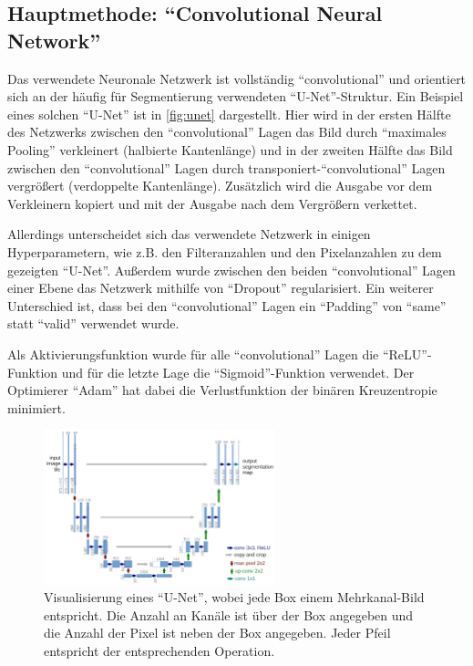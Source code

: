 \subsection{Hauptmethode: \enquote{Convolutional Neural Network}}
\label{ssec:Hauptmethode}

Das verwendete Neuronale Netzwerk ist vollständig \enquote{convolutional} und orientiert sich an der häufig für Segmentierung verwendeten \enquote{U-Net}-Struktur.\cite{ronneberger2015unet}
Ein Beispiel eines solchen \enquote{U-Net} ist in \autoref{fig:unet} dargestellt.
Hier wird in der ersten Hälfte des Netzwerks zwischen den \enquote{convolutional} Lagen das Bild durch \enquote{maximales Pooling} verkleinert (halbierte Kantenlänge) 
und in der zweiten Hälfte das Bild zwischen den \enquote{convolutional} Lagen durch transponiert-\enquote{convolutional} Lagen vergrößert (verdoppelte Kantenlänge).
Zusätzlich wird die Ausgabe vor dem Verkleinern kopiert und mit der Ausgabe nach dem Vergrößern verkettet.

Allerdings unterscheidet sich das verwendete Netzwerk in einigen Hyperparametern, wie z.B. den Filteranzahlen und den Pixelanzahlen zu dem gezeigten \enquote{U-Net}.
Außerdem wurde zwischen den beiden \enquote{convolutional} Lagen einer Ebene das Netzwerk mithilfe von \enquote{Dropout} regularisiert.
Ein weiterer Unterschied ist, dass bei den \enquote{convolutional} Lagen ein \enquote{Padding} von \enquote{same} statt \enquote{valid} verwendet wurde.

Als Aktivierungsfunktion wurde für alle \enquote{convolutional} Lagen die \enquote{ReLU}-Funktion und für die letzte Lage die \enquote{Sigmoid}-Funktion verwendet.
Der Optimierer \enquote{Adam} hat dabei die Verlustfunktion der binären Kreuzentropie minimiert.

\begin{figure}
    \centering
    \includegraphics[width=0.6\textwidth]{images/unet.png}
    \caption{Visualisierung eines \enquote{U-Net}, %
    wobei jede Box einem Mehrkanal-Bild entspricht. Die Anzahl an Kanäle ist über der Box angegeben und die Anzahl der Pixel ist neben der Box angegeben. %
    Jeder Pfeil entspricht der entsprechenden Operation.\cite{ronneberger2015unet}}
    \label{fig:unet}
\end{figure}


